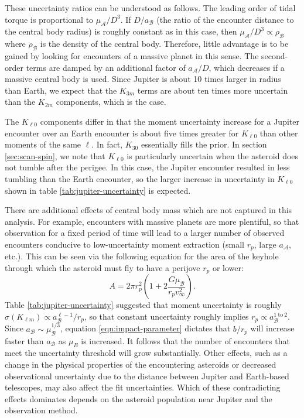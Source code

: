 \documentclass[fleqn,usenatbib]{mnras}
\newcommand{\parens}[1]{\left( #1 \right)}
\begin{document}
These uncertainty ratios can be understood as follows. The leading order of tidal torque is proportional to $\mu_\mathcal{A} / D^3$. If $D/a_\mathcal{B}$ (the ratio of the encounter distance to the central body radius) is roughly constant as in this case, then $\mu_\mathcal{A} / D^3 \propto \rho_\mathcal{B}$ where $\rho_\mathcal{B}$ is the density of the central body. Therefore, little advantage is to be gained by looking for encounters of a massive planet in this sense. The second-order terms are damped by an additional factor of $a_\mathcal{A}/D$, which decreases if a massive central body is used. Since Jupiter is about 10 times larger in radius than Earth, we expect that the $K_{3m}$ terms are about ten times more uncertain than the $K_{2m}$ components, which is the case.

The $K_{\ell 0}$ components differ in that the moment uncertainty increase for a Jupiter encounter over an Earth encounter is about five times greater for $K_{\ell 0}$ than other moments of the same $\ell$. In fact, $K_{30}$ essentially fills the prior. In section \ref{sec:scan-spin}, we note that $K_{\ell 0}$ is particularly uncertain when the asteroid does not tumble after the perigee. In this case, the Jupiter encounter resulted in less tumbling than the Earth encounter, so the larger increase in uncertainty in $K_{\ell 0}$ shown in table \ref{tab:jupiter-uncertainty} is expected.

There are additional effects of central body mass which are not captured in this analysis. For example, encounters with massive planets are more plentiful, so that observation for a fixed period of time will lead to a larger number of observed encounters conducive to low-uncertainty moment extraction (small $r_p$, large $a_\mathcal{A}$, etc.). This can be seen via the following equation for the area of the keyhole through which the asteroid must fly to have a perijove $r_p$ or lower:
\begin{equation}
  A = 2 \pi r_p^2 \parens{1+2\frac{G\mu_\mathcal{B}}{r_p v_\infty^2}}.
  \label{eqn:impact-parameter}
\end{equation}
Table \ref{tab:jupiter-uncertainty} suggested that moment uncertainty is roughly $\sigma(K_{\ell m}) \propto a_\mathcal{B}^{\ell - 1} / r_p$, so that constant uncertainty roughly implies $r_p \propto a_\mathcal{B}^{1\ \text{to} \ 2}$. Since $a_\mathcal{B} \sim \mu_\mathcal{B}^{1/3}$, equation \ref{eqn:impact-parameter} dictates that $b/r_p$ will increase faster than $a_\mathcal{B}$ as $\mu_B$ is increased. It follows that the number of encounters that meet the uncertainty threshold will grow substantially. Other effects, such as a change in the physical properties of the encountering asteroids or decreased observational uncertainty due to the distance between Jupiter and Earth-based telescopes, may also affect the fit uncertainties. Which of these contradicting effects dominates depends on the asteroid population near Jupiter and the observation method.
\end{document}
